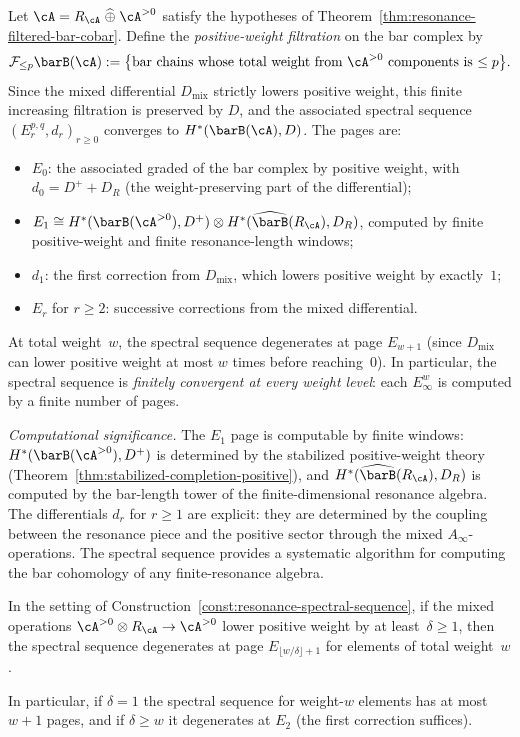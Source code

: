 \begin{construction}
\label{const:resonance-spectral-sequence}
Let $\cA = R_\cA \;\widehat{\oplus}\; \cA^{>0}$ satisfy the
hypotheses of
Theorem~\ref{thm:resonance-filtered-bar-cobar}. Define the
\emph{positive-weight filtration} on the bar complex by
\[
\mathcal{F}_{\le p} \barB(\cA)
:= \bigl\{\text{bar chains whose total weight from $\cA^{>0}$
components is $\le p$}\bigr\}.
\]
Since the mixed differential $D_{\mathrm{mix}}$ strictly
lowers positive weight, this finite increasing filtration is
preserved by $D$, and the associated spectral sequence
$(E_r^{p,q}, d_r)_{r \ge 0}$ converges to
$H^*(\barB(\cA), D)$. The pages are:
\begin{itemize}
\item $E_0$: the associated graded of the bar complex by
 positive weight, with $d_0 = D^+ + D_R$ (the weight-preserving
 part of the differential);
\item $E_1 \cong H^*(\barB(\cA^{>0}), D^+) \otimes
 H^*(\widehat{\barB}(R_\cA), D_R)$, computed by finite
 positive-weight and finite resonance-length windows;
\item $d_1$: the first correction from $D_{\mathrm{mix}}$,
 which lowers positive weight by exactly~$1$;
\item $E_r$ for $r \ge 2$: successive corrections from the mixed
 differential.
\end{itemize}
At total weight~$w$, the spectral sequence degenerates at page
$E_{w+1}$ (since $D_{\mathrm{mix}}$ can lower positive
weight at most $w$ times before reaching~$0$).
In particular, the spectral sequence is
\emph{finitely convergent at every weight level}: each $E_\infty^w$
is computed by a finite number of pages.

\emph{Computational significance.}
The $E_1$ page is computable by finite windows:
$H^*(\barB(\cA^{>0}), D^+)$ is determined by the stabilized
positive-weight theory
(Theorem~\ref{thm:stabilized-completion-positive}), and
$H^*(\widehat{\barB}(R_\cA), D_R)$ is computed by the
bar-length tower of the finite-dimensional resonance algebra. The
differentials $d_r$ for $r \ge 1$ are
explicit: they are determined by the coupling between the
resonance piece and the positive sector through the
mixed $A_\infty$-operations. The spectral sequence provides a
systematic algorithm for computing the bar cohomology of any
finite-resonance algebra.
\end{construction}

\begin{proposition}
\label{prop:resonance-ss-degeneration}
In the setting of
Construction~\textup{\ref{const:resonance-spectral-sequence}},
if the mixed operations
$\cA^{>0} \otimes R_\cA \to \cA^{>0}$ lower positive weight
by at least~$\delta \ge 1$, then the spectral sequence
degenerates at page $E_{\lfloor w/\delta \rfloor + 1}$ for
elements of total weight~$w$.

In particular, if $\delta = 1$ the spectral sequence for
weight-$w$ elements has at most $w+1$ pages, and if
$\delta \ge w$ it degenerates at $E_2$
\textup{(}the first correction suffices\textup{)}.
\end{proposition}

